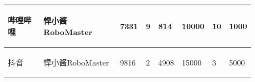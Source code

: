 \begin{longtable}{ X | X | X | X | X | X | X | X }
    \hline
    
        \begin{center}
            哔哩哔哩
        \end{center} &
        \begin{center}
            悍小酱RoboMaster
        \end{center} &
        \begin{center}
            7331
        \end{center} &
        \begin{center}
            9
        \end{center} &
        \begin{center}
            814
        \end{center} &
        \begin{center}
            10000
        \end{center} &
        \begin{center}
            10
        \end{center} &
        \begin{center}
            1000
        \end{center} \\

    \hline
    
        \begin{center}
            抖音
        \end{center} &
        \begin{center}
            悍小酱RoboMaster
        \end{center} &
        \begin{center}
            9816
        \end{center} &
        \begin{center}
            2
        \end{center} &
        \begin{center}
            4908
        \end{center} &
        \begin{center}
            15000
        \end{center} &
        \begin{center}
            3
        \end{center} &
        \begin{center}
            5000
        \end{center} \\
        
    \hline


\end{longtable}
